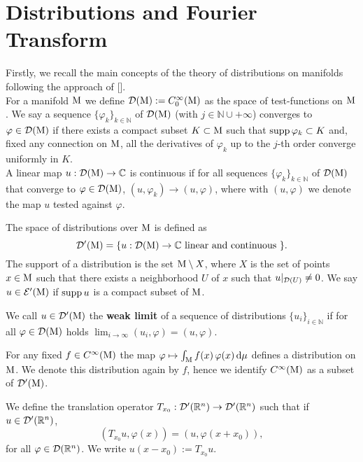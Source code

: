 \appendix
\chapter{Distributions and Fourier Transform}

Firstly, we recall the main concepts of the theory of distributions on manifolds following the approach of [\citealp{fried2}].\\

\noindent For a manifold $\mathrm{M}$ we define $\mathcal{D}(\mathrm{M}):=C_0^\infty(\mathrm{M})$ as the space of test-functions on $\mathrm{M}$. We say a sequence $\{\varphi_k\}_{k\in\mathbb{N}}$ of $\mathcal{D}(\mathrm{M})$ (with $j\in\mathbb{N}\cup+\infty$) converges to $\varphi\in \mathcal{D}(\mathrm{M})$ if there exists a compact subset $K\subset\mathrm{M}$ such that $\text{supp}\,\varphi_k\subset K$ and, fixed any connection on $\mathrm{M}$, all the derivatives of $\varphi_k$ up to the $j$-th order converge uniformly in $K$.\\
A linear map $u:\mathcal{D}(\mathrm{M})\to{\mathbb C}$ is continuous if for all sequences $\{\varphi_k\}_{k\in\mathbb{N}}$ of $\mathcal{D}(\mathrm{M})$ that converge to $\varphi\in\mathcal{D}(\mathrm{M})$, $(u,\varphi_k)\to(u,\varphi)$, where with $(u,\varphi)$ we denote the map $u$ tested against $\varphi$.


\begin{definition}
	The space of distributions over $\mathrm{M}$ is defined as
	\[	\mathcal{D}'(\mathrm{M})=\{u:\mathcal{D}(\mathrm{M})\to{\mathbb C}\text{ linear and continuous }   \}.				\]
	The support of a distribution is the set $\mathrm{M}\setminus X$, where $X$ is the set of points $x\in\mathrm{M}$ such that there exists a neighborhood $U$ of $x$ such that $u|_{\mathcal{D}(U)}\neq0$. We say $u\in\mathcal{E}'(\mathrm{M})$ if $\text{supp}\,u$ is a compact subset of $\mathrm{M}$.
\end{definition}

\noindent We call $u\in\mathcal{D}'(\mathrm{M})$ the \textbf{weak limit} of a sequence of distributions $\{u_i\}_{i\in\mathbb{N}}$ if for all $\varphi\in\mathcal{D}(\mathrm{M})$ holds $\lim_{i\to\infty}(u_i,\varphi)=(u,\varphi)$.


\begin{rem}
	For any fixed $f\in C^\infty(\mathrm{M})$ the map $\varphi\mapsto\int_{\mathrm{M}}f(x)\,\varphi(x)\,\mathrm d\mu$ defines a distribution on $\mathrm{M}$. We denote this distribution again by $f$, hence we identify $C^\infty(\mathrm{M})$ as a subset of $\mathcal{D}'(\mathrm{M})$.
\end{rem}


\begin{definition}
	We define the translation operator $T_{x_0}:\mathcal{D}'({\mathbb R}^n)\to\mathcal{D}'({\mathbb R}^n)$ such that if $u\in\mathcal{D}'({\mathbb R}^n)$,
	\[	(T_{x_0}u,\varphi(x))=\left(u,\varphi(x+x_0)\right),		\]
	for all $\varphi\in\mathcal{D}({\mathbb R}^n)$. We write $u(x-x_0):=T_{x_0}u$.
	\label{defn:transl}
\end{definition}

